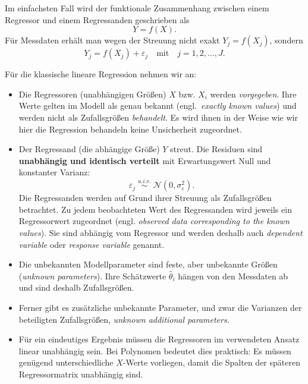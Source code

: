 Im einfachsten Fall wird der funktionale Zusammenhang zwischen einem Regressor und einem Regressanden geschrieben als
\begin{equation}
Y = f(X) .
\label{Kap2Modellgleichung}
\end{equation}
Für Messdaten erhält man wegen der Streuung nicht exakt $Y_j=f(X_j)$, sondern
\begin{equation}
Y_j = f(X_j) + \varepsilon_j \quad \mathrm{mit} \quad j = 1,2,\ldots,J .
\label{Kap2ModellglmitResiduen}
\end{equation}

Für die klassische lineare Regression nehmen wir an:
\begin{itemize}
\item Die Regressoren (unabhängigen Größen) $X$ bzw. $X_i$ werden \emph{vorgegeben}. Ihre Werte gelten im Modell als genau bekannt (engl.\ \textsl{exactly known values}) und werden nicht als Zufallsgrößen \emph{behandelt}. Es wird ihnen in der Weise wie wir hier die Regression behandeln keine Unsicherheit zugeordnet.
\item Der Regressand (die abhängige Größe) $Y$ streut. Die Residuen sind \textbf{unabhängig und identisch verteilt} mit Erwartungswert Null und konstanter Varianz:
\begin{equation}
\varepsilon_j \; \overset{u.i.v.}{\sim} \; \mathcal{N}(0,\sigma_{\varepsilon}^2) .
\label{Resinormalverteilt}
\end{equation}
Die Regressanden werden auf Grund ihrer Streuung als Zufallsgrößen betrachtet.
Zu jedem beobachteten Wert des Regressanden wird jeweils ein Regressorwert
zugeordnet (engl. \textsl{observed data corresponding to the known values}).
Sie sind abhängig vom Regressor und werden deshalb auch \textsl{dependent variable} oder \textsl{response variable} genannt.
\item Die unbekannten Modellparameter sind feste, aber unbekannte Größen (\textsl{unknown parameters}). Ihre Schätzwerte $\hat\theta_i$ hängen von den Messdaten ab und sind deshalb Zufallsgrößen.
\item Ferner gibt es zusätzliche unbekannte Parameter, und zwar die Varianzen der beteiligten Zufallsgrößen, \textsl{unknown additional parameters}.
\item Für ein eindeutiges Ergebnis müssen die Regressoren im verwendeten Ansatz linear unabhängig sein. Bei Polynomen bedeutet dies praktisch: Es müssen genügend unterschiedliche $X$-Werte vorliegen, damit die Spalten der späteren Regressormatrix unabhängig sind.
\end{itemize}

